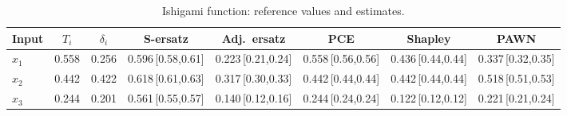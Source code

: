 \documentclass[11pt,a4paper]{article}
\begin{document}
\begin{table}[H]\centering\footnotesize
\begin{tabular}{@{}lccccccc@{}}\toprule
Input & $T_i$ & $\delta_i$ & S-ersatz & Adj.\ ersatz & PCE & Shapley & PAWN \\ \midrule
$x_{1}$ & 0.558 & 0.256 & 0.596\,{\scriptsize[0.58,0.61]} & 0.223\,{\scriptsize[0.21,0.24]} & 0.558\,{\scriptsize[0.56,0.56]} & 0.436\,{\scriptsize[0.44,0.44]} & 0.337\,{\scriptsize[0.32,0.35]} \\
$x_{2}$ & 0.442 & 0.422 & 0.618\,{\scriptsize[0.61,0.63]} & 0.317\,{\scriptsize[0.30,0.33]} & 0.442\,{\scriptsize[0.44,0.44]} & 0.442\,{\scriptsize[0.44,0.44]} & 0.518\,{\scriptsize[0.51,0.53]} \\
$x_{3}$ & 0.244 & 0.201 & 0.561\,{\scriptsize[0.55,0.57]} & 0.140\,{\scriptsize[0.12,0.16]} & 0.244\,{\scriptsize[0.24,0.24]} & 0.122\,{\scriptsize[0.12,0.12]} & 0.221\,{\scriptsize[0.21,0.24]} \\
\bottomrule\end{tabular}
\caption{Ishigami function: reference values and estimates.}
\label{tab:in3}
\end{table}
\end{document}
